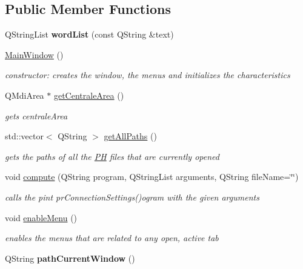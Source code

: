 \subsection*{Public Member Functions}
\begin{DoxyCompactItemize}
\item 
\hypertarget{classMainWindow_ab4a9ef5dbbfabf44e6af7494287307aa}{Q\+String\+List {\bfseries word\+List} (const Q\+String \&text)}\label{classMainWindow_ab4a9ef5dbbfabf44e6af7494287307aa}

\item 
\hypertarget{classMainWindow_a34c4b4207b46d11a4100c9b19f0e81bb}{\hyperlink{classMainWindow_a34c4b4207b46d11a4100c9b19f0e81bb}{Main\+Window} ()}\label{classMainWindow_a34c4b4207b46d11a4100c9b19f0e81bb}

\begin{DoxyCompactList}\small\item\em constructor\+: creates the window, the menus and initializes the characteristics \end{DoxyCompactList}\item 
Q\+Mdi\+Area $\ast$ \hyperlink{classMainWindow_a7ef4a7c09626b415053b30bc412a3b1f}{get\+Centrale\+Area} ()
\begin{DoxyCompactList}\small\item\em gets centrale\+Area \end{DoxyCompactList}\item 
\hypertarget{classMainWindow_afabdfcfe9a925f3b91d93980da94068e}{std\+::vector$<$ Q\+String $>$ \hyperlink{classMainWindow_afabdfcfe9a925f3b91d93980da94068e}{get\+All\+Paths} ()}\label{classMainWindow_afabdfcfe9a925f3b91d93980da94068e}

\begin{DoxyCompactList}\small\item\em gets the paths of all the \hyperlink{classPH}{P\+H} files that are currently opened \end{DoxyCompactList}\item 
void \hyperlink{classMainWindow_a8a30572d7170d0a51737cd4991f0a05f}{compute} (Q\+String program, Q\+String\+List arguments, Q\+String file\+Name=\char`\"{}\char`\"{})
\begin{DoxyCompactList}\small\item\em calls the pint pr\+Connection\+Settings()ogram with the given arguments \end{DoxyCompactList}\item 
void \hyperlink{classMainWindow_ac4c3ec77ba5666ff9ef670b4b02c6838}{enable\+Menu} ()
\begin{DoxyCompactList}\small\item\em enables the menus that are related to any open, active tab \end{DoxyCompactList}\item 
\hypertarget{classMainWindow_a40c1a091a42559d7531ee79b6debd323}{Q\+String {\bfseries path\+Current\+Window} ()}\label{classMainWindow_a40c1a091a42559d7531ee79b6debd323}

\end{DoxyCompactItemize}

